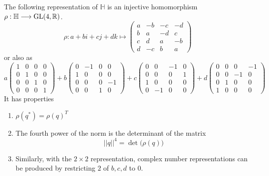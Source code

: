     \begin{theorem}
    The following representation of $\mathbb{H}$ is an injective homomorphism $\rho: \mathbb{H} \longrightarrow \operatorname{GL}(4, \mathbb{R})$. 
    \begin{equation}
      \rho: a+bi+cj+dk \mapsto \begin{pmatrix}
      a&-b&-c&-d \\
      b&a&-d&c\\
      c&d&a&-b\\
      d&-c&b&a
      \end{pmatrix}
    \end{equation}
    or also as
    \begin{equation}
      a \begin{pmatrix}
      1 &0 &0 &0 \\
      0& 1&0&0\\
      0&0&1&0\\
      0&0&0&1
      \end{pmatrix} + b \begin{pmatrix}
      0&-1&0&0\\1&0&0&0\\0&0&0&-1\\0&0&1&0
      \end{pmatrix} + c\begin{pmatrix}
      0&0&-1&0\\0&0&0&1\\1&0&0&0\\0&-1&0&0
      \end{pmatrix} + d \begin{pmatrix}
      0&0&0&-1\\0&0&-1&0\\0&1&0&0\\1&0&0&0
      \end{pmatrix}
    \end{equation}
    It has properties
    \begin{enumerate}
      \item $\rho(q^*) = \rho(q)^T$
      \item The fourth power of the norm is the determinant of the matrix 
        \begin{equation}
          ||q||^4 = \det\big( \rho (q)\big)
        \end{equation}
      \item Similarly, with the $2\times 2$ representation, complex number representations can be produced by restricting $2$ of $b, c, d$ to $0$. 
    \end{enumerate}
    \end{theorem}

